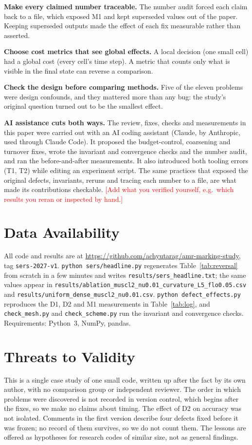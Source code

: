 \documentclass[conference]{IEEEtran}
\newcommand{\todo}[1]{\textcolor{red}{[#1]}}
\begin{document}
\textbf{Make every claimed number traceable.} The number audit forced each
claim back to a file, which exposed M1 and kept superseded values out of
the paper. Keeping superseded outputs made the effect of each fix
measurable rather than asserted.

\textbf{Choose cost metrics that see global effects.} A local decision (one
small cell) had a global cost (every cell's time step). A metric that
counts only what is visible in the final state can reverse a comparison.

\textbf{Check the design before comparing methods.} Five of the eleven
problems were design confounds, and they mattered more than any bug: the
study's original question turned out to be the smallest effect.

\textbf{AI assistance cuts both ways.} The review, fixes, checks and
measurements in this paper were carried out with an AI coding assistant
(Claude, by Anthropic, used through Claude Code). It proposed the
budget-control, coarsening and turnover fixes, wrote the invariant and
convergence checks and the number audit, and ran the before-and-after
measurements. It also introduced both tooling errors (T1, T2) while editing
an experiment script. The same practices that exposed the original defects,
invariants, reruns and tracing each number to a file, are what made its
contributions checkable. \todo{Add what you verified yourself, e.g.\ which
results you reran or inspected by hand.}

\section{Data Availability}
All code and results are at
\url{https://github.com/achyutarag/amr-marking-study}, tag
\texttt{sers-2027-v1}. \texttt{python sers/headline.py}
regenerates Table~\ref{tab:reversal} from scratch in a few minutes and
writes \texttt{results/sers\_headline.txt}; the same values appear in
\texttt{results/ablation\_muscl2\_nu0.01\_curvature\_L5\_flo0.05.csv} and
\texttt{results/uniform\_dense\_muscl2\_nu0.01.csv}. \texttt{python
defect\_effects.py} reproduces the D1, D2 and M1 measurements in
Table~\ref{tab:log}, and \texttt{check\_mesh.py} and
\texttt{check\_scheme.py} run the invariant and convergence checks.
Requirements: Python~3, NumPy, pandas.

\section{Threats to Validity}
This is a single case study of one small code, written up after the fact by
its own author, with no comparison group or independent reviewer. The order
in which problems were discovered is not recorded in version control, which
begins after the fixes, so we make no claims about timing. The effect of D2
on accuracy was not isolated. Comments in the first version describe four
defects fixed before it was frozen; no record of them survives, so we do
not count them. The lessons are offered as
hypotheses for research codes of similar size, not as general findings.
\end{document}
